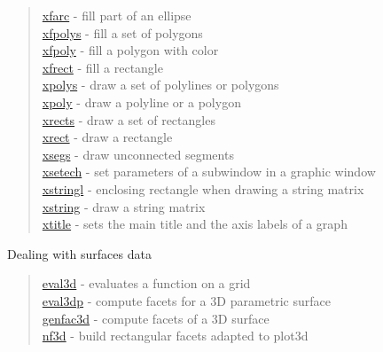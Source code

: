 \begin{quote}
\hyperlink{xfarc}{xfarc} - fill part of an ellipse\\
\hyperlink{xfpolys}{xfpolys} - fill a set of polygons \\
\hyperlink{xfpoly}{xfpoly} - fill a polygon with color \\
\hyperlink{xfrect}{xfrect} - fill a rectangle \\
\hyperlink{xpolys}{xpolys} - draw a set of polylines or polygons \\
\hyperlink{xpoly}{xpoly} - draw a polyline or a polygon \\
\hyperlink{xrects}{xrects} - draw a set of rectangles\\
\hyperlink{xrect}{xrect} - draw a rectangle\\
\hyperlink{xsegs}{xsegs} - draw unconnected segments \\
\hyperlink{xsetech}{xsetech} - set parameters of a subwindow in a graphic window\\
\hyperlink{xstringl}{xstringl} - enclosing rectangle when drawing a string matrix \\
\hyperlink{xstring}{xstring} - draw a string matrix \\
\hyperlink{xtitle}{xtitle} - sets the main title and the axis labels of a graph\\
\end{quote}

Dealing with surfaces data
\begin{quote}
\noindent
\hyperlink{eval3d}{eval3d} - evaluates a function on a grid \\
\hyperlink{eval3dp}{eval3dp} - compute facets for a 3D parametric surface\\
\hyperlink{genfac3d}{genfac3d} - compute facets of a 3D surface\\
\hyperlink{nf3d}{nf3d} - build rectangular facets adapted to plot3d \\
\end{quote}


































